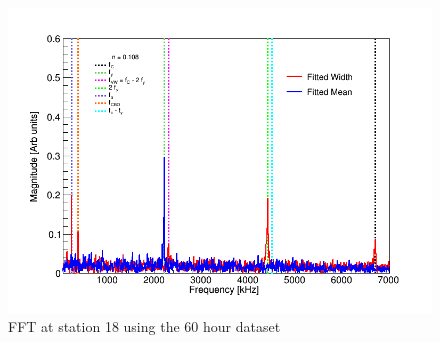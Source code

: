 \begin{figure}[!h]
\centering 
\includegraphics[scale=0.5]{Figures/FFT_fittedWidth_fittedMean_station18.png}
\decoRule
\caption{FFT at station 18 using the 60 hour dataset}
\label{fig:FFT_fittedWidth_fittedMean_station18.png}
\end{figure}

